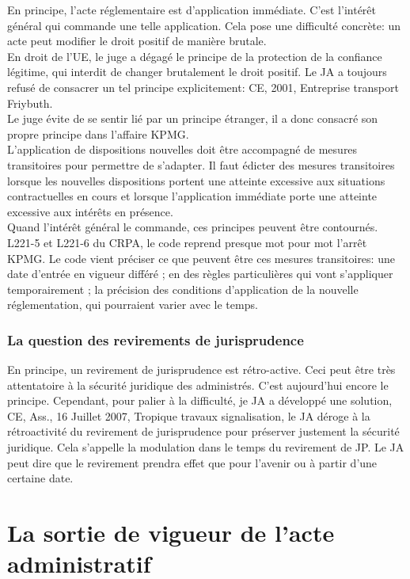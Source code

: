 \documentclass[10pt, a4paper, openany]{book}
\begin{document}
En principe, l'acte réglementaire est d'application immédiate. C'est l'intérêt général qui commande une telle application. Cela pose une difficulté concrète: un acte peut modifier le droit positif de manière brutale. \\
En droit de l'UE, le juge a dégagé le principe de la protection de la confiance légitime, qui interdit de changer brutalement le droit positif. Le JA a toujours refusé de consacrer un tel principe explicitement: CE, 2001, Entreprise transport Friybuth. \\
Le juge évite de se sentir lié par un principe étranger, il a donc consacré son propre principe dans l'affaire KPMG. \\
L'application de dispositions nouvelles doit être accompagné de mesures transitoires pour permettre de s'adapter. Il faut édicter des mesures transitoires lorsque les nouvelles dispositions portent une atteinte excessive aux situations contractuelles en cours et lorsque l'application immédiate porte une atteinte excessive aux intérêts en présence. \\
Quand l'intérêt général le commande, ces principes peuvent être contournés. \\
L221-5 et L221-6 du CRPA, le code reprend presque mot pour mot l'arrêt KPMG. Le code vient préciser ce que peuvent être ces mesures transitoires: une date d'entrée en vigueur différé ; en des règles particulières qui vont s'appliquer temporairement ; la précision des conditions d'application de la nouvelle réglementation, qui pourraient varier avec le temps. 

\subsubsection{La question des revirements de jurisprudence}

En principe, un revirement de jurisprudence est rétro-active. Ceci peut être très attentatoire à la sécurité juridique des administrés. C'est aujourd'hui encore le principe. Cependant, pour palier à la difficulté, je JA a développé une solution, CE, Ass., 16 Juillet 2007, Tropique travaux signalisation, le JA déroge à la rétroactivité du revirement de jurisprudence pour préserver justement la sécurité juridique. Cela s'appelle la modulation dans le temps du revirement de JP. Le JA peut dire que le revirement prendra effet que pour l'avenir ou à partir d'une certaine date. 

\section{La sortie de vigueur de l'acte administratif}
\end{document}
